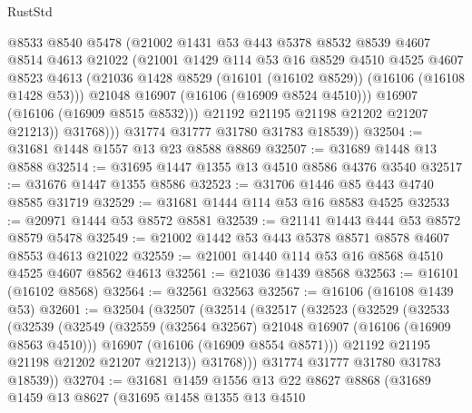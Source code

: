 \begin{lexlean}{RustStd}
\begin{coremodule}
                  @8533
                  @8540
                  @5478
                  (@21002
                    @1431
                    @53
                    @443
                    @5378
                    @8532
                    @8539
                    @4607
                    @8514
                    @4613
                    @21022
                    (@21001
                      @1429
                      @114
                      @53
                      @16
                      @8529
                      @4510
                      @4525
                      @4607
                      @8523
                      @4613
                      (@21036 @1428 @8529 (@16101 (@16102 @8529)) (@16106 (@16108 @1428 @53)))
                      @21048
                      @16907
                      (@16106 (@16909 @8524 @4510)))
                    @16907
                    (@16106 (@16909 @8515 @8532)))
                  @21192
                  @21195
                  @21198
                  @21202
                  @21207
                  @21213))
              @31768)))
        @31774
        @31777
        @31780
        @31783
        @18539))
@32504 := @31681 @1448 @1557 @13 @23 @8588 @8869
@32507 := @31689 @1448 @13 @8588
@32514 := @31695 @1447 @1355 @13 @4510 @8586 @4376 @3540
@32517 := @31676 @1447 @1355 @8586
@32523 := @31706 @1446 @85 @443 @4740 @8585 @31719
@32529 := @31681 @1444 @114 @53 @16 @8583 @4525
@32533 := @20971 @1444 @53 @8572 @8581
@32539 := @21141 @1443 @444 @53 @8572 @8579 @5478
@32549 := @21002 @1442 @53 @443 @5378 @8571 @8578 @4607 @8553 @4613 @21022
@32559 := @21001 @1440 @114 @53 @16 @8568 @4510 @4525 @4607 @8562 @4613
@32561 := @21036 @1439 @8568
@32563 := @16101 (@16102 @8568)
@32564 := @32561 @32563
@32567 := @16106 (@16108 @1439 @53)
@32601 := @32504
    (@32507
      (@32514
        (@32517
          (@32523
            (@32529
              (@32533
                (@32539
                  (@32549
                    (@32559 (@32564 @32567) @21048 @16907 (@16106 (@16909 @8563 @4510)))
                    @16907
                    (@16106 (@16909 @8554 @8571)))
                  @21192
                  @21195
                  @21198
                  @21202
                  @21207
                  @21213))
              @31768)))
        @31774
        @31777
        @31780
        @31783
        @18539))
@32704 := @31681
    @1459
    @1556
    @13
    @22
    @8627
    @8868
    (@31689
      @1459
      @13
      @8627
      (@31695
        @1458
        @1355
        @13
        @4510

\end{coremodule}
\end{lexlean}

